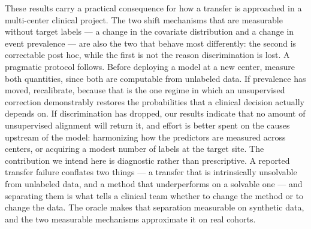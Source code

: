 %
%



These results carry a practical consequence for how a transfer is approached in
a multi-center clinical project. The two shift mechanisms that are measurable
without target labels --- a change in the covariate distribution and a change in
event prevalence --- are also the two that behave most differently: the second is
correctable post hoc, while the first is not the reason discrimination is lost.
A pragmatic protocol follows. Before deploying a model at a new center, measure
both quantities, since both are computable from unlabeled data. If prevalence
has moved, recalibrate, because that is the one regime in which an unsupervised
correction demonstrably restores the probabilities that a clinical decision
actually depends on. If discrimination has dropped, our results indicate that no
amount of unsupervised alignment will return it, and effort is better spent on
the causes upstream of the model: harmonizing how the predictors are measured
across centers, or acquiring a modest number of labels at the target site. The
contribution we intend here is diagnostic rather than prescriptive. A reported
transfer failure conflates two things --- a transfer that is intrinsically
unsolvable from unlabeled data, and a method that underperforms on a solvable
one --- and separating them is what tells a clinical team whether to change the
method or to change the data. The oracle makes that separation measurable on
synthetic data, and the two measurable mechanisms approximate it on real
cohorts.



